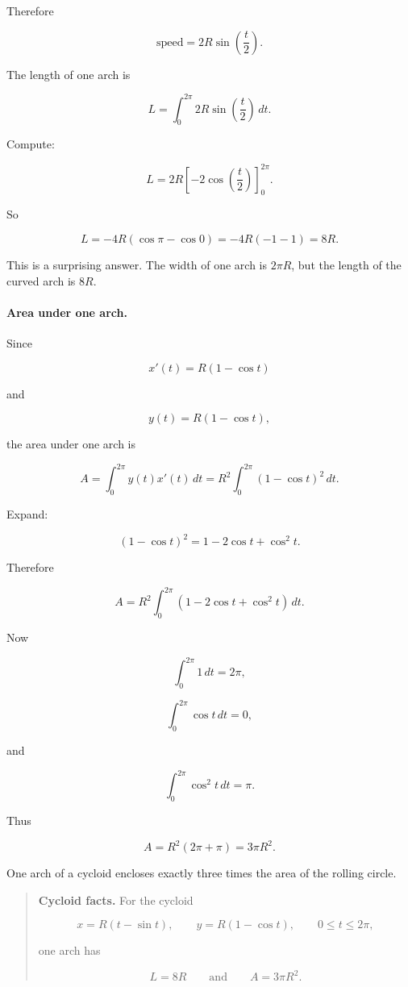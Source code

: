 Therefore

\[
\text{speed}=2R\sin\left(\frac t2\right).
\]

The length of one arch is

\[
L=\int_0^{2\pi}2R\sin\left(\frac t2\right)\,dt.
\]

Compute:

\[
L
=
2R\left[-2\cos\left(\frac t2\right)\right]_0^{2\pi}.
\]

So

\[
L
=
-4R\left(\cos\pi-\cos0\right)
=
-4R(-1-1)
=
\boxed{8R}.
\]

This is a surprising answer.  The width of one arch is \(2\pi R\), but the length of the
curved arch is \(8R\).

\paragraph{Area under one arch.}
Since

\[
x'(t)=R(1-\cos t)
\]

and

\[
y(t)=R(1-\cos t),
\]

the area under one arch is

\[
A=\int_0^{2\pi} y(t)x'(t)\,dt
=
R^2\int_0^{2\pi}(1-\cos t)^2\,dt.
\]

Expand:

\[
(1-\cos t)^2=1-2\cos t+\cos^2t.
\]

Therefore

\[
A=
R^2\int_0^{2\pi}
\left(1-2\cos t+\cos^2t\right)\,dt.
\]

Now

\[
\int_0^{2\pi}1\,dt=2\pi,
\]

\[
\int_0^{2\pi}\cos t\,dt=0,
\]

and

\[
\int_0^{2\pi}\cos^2t\,dt=\pi.
\]

Thus

\[
A=R^2(2\pi+\pi)=\boxed{3\pi R^2}.
\]

One arch of a cycloid encloses exactly three times the area of the rolling circle.

\begin{quote}
\textbf{Cycloid facts.}
For the cycloid

\[
x=R(t-\sin t),
\qquad
y=R(1-\cos t),
\qquad
0\le t\le2\pi,
\]

one arch has

\[
\boxed{L=8R}
\qquad\text{and}\qquad
\boxed{A=3\pi R^2}.
\]
\end{quote}


